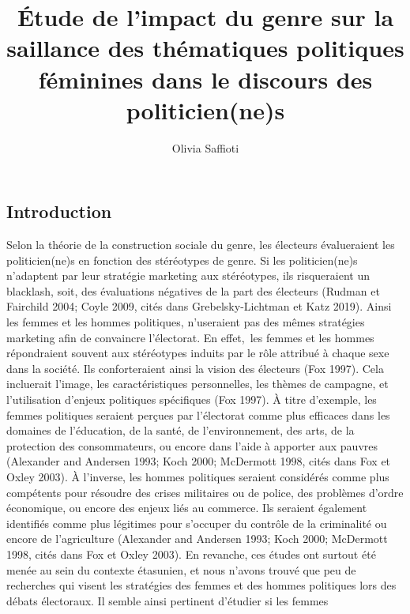 \documentclass[
  letterpaper,
  DIV=11,
  numbers=noendperiod]{scrartcl}
\title{Étude de l'impact du genre sur la saillance des thématiques
politiques féminines dans le discours des politicien(ne)s}
\author{Olivia Saffioti}
\date{}
\begin{document}
\maketitle
\ifdefined\Shaded\renewenvironment{Shaded}{\begin{tcolorbox}[frame hidden, boxrule=0pt, interior hidden, borderline west={3pt}{0pt}{shadecolor}, enhanced, sharp corners, breakable]}{\end{tcolorbox}}\fi

\hypertarget{introduction}{%
\subsection{Introduction}\label{introduction}}

Selon la théorie de la construction sociale du genre, les électeurs
évalueraient les politicien(ne)s en fonction des stéréotypes de genre.
Si les politicien(ne)s n'adaptent par leur stratégie marketing aux
stéréotypes, ils risqueraient un blacklash, soit, des évaluations
négatives de la part des électeurs (Rudman et Fairchild 2004; Coyle
2009, cités dans Grebelsky-Lichtman et Katz 2019). Ainsi les femmes et
les hommes politiques, n'useraient pas des mêmes stratégies marketing
afin de convaincre l'électorat. En effet,~les femmes et les hommes
répondraient souvent aux stéréotypes induits par le rôle attribué à
chaque sexe dans la société. Ils conforteraient ainsi la vision des
électeurs (Fox 1997). Cela incluerait l'image, les caractéristiques
personnelles, les thèmes de campagne, et l'utilisation d'enjeux
politiques spécifiques (Fox 1997). À titre d'exemple, les femmes
politiques seraient perçues par l'électorat comme plus efficaces dans
les domaines de l'éducation, de la santé, de l'environnement, des arts,
de la protection des consommateurs, ou encore dans l'aide à apporter aux
pauvres (Alexander and Andersen 1993; Koch 2000; McDermott 1998, cités
dans Fox et Oxley 2003). À l'inverse, les hommes politiques seraient
considérés comme plus compétents pour résoudre des crises militaires ou
de police, des problèmes d'ordre économique, ou encore des enjeux liés
au commerce. Ils seraient également identifiés comme plus légitimes pour
s'occuper du contrôle de la criminalité ou encore de l'agriculture
(Alexander and Andersen 1993; Koch 2000; McDermott 1998, cités dans Fox
et Oxley 2003). En revanche, ces études ont surtout été menée au sein du
contexte étasunien, et nous n'avons trouvé que peu de recherches qui
visent les stratégies des femmes et des hommes politiques lors des
débats électoraux. Il semble ainsi pertinent d'étudier si les femmes
\end{document}
